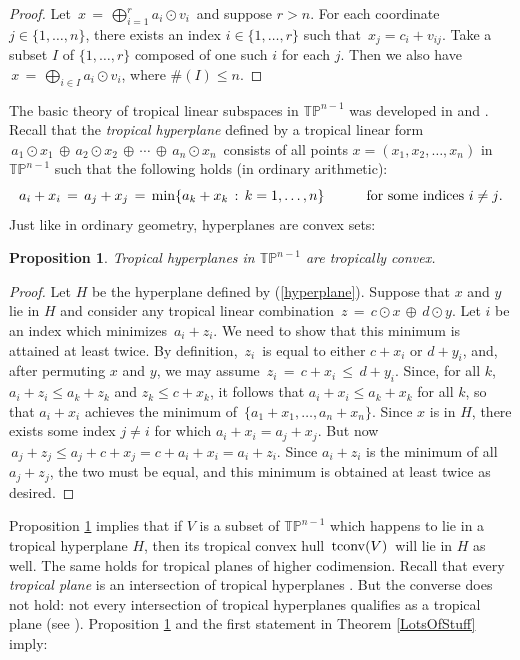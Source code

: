 \documentclass[11pt]{amsart}
\newtheorem{prop}[thm]{Proposition}
\newcommand{\TP}{\mathbb{TP}}
\begin{document}
\begin{proof}
Let $\,x\,= \, \bigoplus_{i=1}^r a_i \odot v_i \,$
and suppose $r > n$. For each coordinate $j \in
\{1,\ldots,n\}$, there exists an index $i \in \{1,\ldots,r \}$ such that
$\,x_j = c_i + v_{ij}$. Take a
subset $I$ of $\{1,\ldots,r\}$ composed of one such $i$ for each $j$.
Then we also have $\,x\,= \, \bigoplus_{i \in I} a_i \odot v_i $,
where $\# (I) \leq n$.
\end{proof}

The basic theory of tropical linear subspaces in $\TP^{n-1}$ was developed in
\cite{RGST} and \cite{SS}. Recall that the \emph{tropical hyperplane}
defined by a tropical linear form
$\,a_1 \odot x_1 \,\oplus \,
a_2 \odot x_2 \,\oplus \,\cdots\,\oplus\,
a_n \odot x_n \,$
consists of all points $x = (x_1,x_2,\ldots,x_n)$ in $\TP^{n-1}$ such that
the following holds (in ordinary arithmetic):
\begin{equation}
\label{hyperplane}
 a_i + x_i \, = \,
a_j + x_j \, = \, {\rm min} \{a_k + x_k \, : \, k =1,\ldots,n \} \quad
\qquad \hbox{for some indices $i \not= j$}.
\end{equation}
Just like in ordinary geometry, hyperplanes are convex sets:

\begin{prop} \label{hypconv}
Tropical hyperplanes in $\TP^{n-1}$ are tropically convex.
\end{prop}

\begin{proof}
Let $H$ be the hyperplane defined by (\ref{hyperplane}).
Suppose that $x$ and $y$ lie in $H$ and consider any
tropical linear combination $\, z \, = \, c \odot x \, \oplus \, d \odot y $.
Let $i$ be an index which minimizes $\,a_i + z_i$.
We need to show that this minimum is attained at least twice.
By definition, $\,z_i \,$ is equal to either $c+x_i$ or $d+y_i$,
and, after permuting $x$ and $y$, we may assume
$\,z_i \, = \, c + x_i \, \leq \, d + y_i $.
 Since, for all $k$, $a_i+z_i \le a_k+z_k$ and $z_k \le c+x_{k}$, it follows
 that $a_i+x_{i}\le a_k+x_{k}$ for all $k$, so that $a_i+x_{i}$ achieves
the minimum of $\, \{a_1+x_1, \ldots,a_n+x_n\}$.
Since $x$ is in $H$, there exists some index $j \not= i$ for which
$a_i+x_i=a_j+x_j$.
But now $\,a_j + z_j \le a_j + c + x_j = c + a_i + x_{i} = a_i + z_i$.
 Since $a_i+z_i$ is the minimum of all
$a_j+z_j$, the two must be equal, and this minimum is obtained at least twice as desired.
\end{proof}

Proposition \ref{hypconv} implies that if $V$
is a subset of $\TP^{n-1}$ which happens to lie
in a tropical hyperplane $H$, then its
tropical convex hull $\,{\rm tconv}(V)\,$ will lie in $H$ as well.
The same holds for tropical planes of higher codimension.
Recall that every \emph{tropical plane}
 is an intersection of tropical hyperplanes \cite{SS}.
But the converse does not hold: not every intersection of tropical
hyperplanes qualifies as a tropical plane (see \cite[\S 5]{RGST}).
Proposition  \ref{hypconv}
and the first statement in Theorem
\ref{LotsOfStuff} imply:
\end{document}
